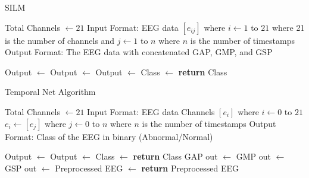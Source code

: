 \documentclass[10pt]{article}
\begin{document}
\begin{algorithm}[H]
\caption{SILM}
    \begin{algorithmic}[2]
     
        \State Total Channels $\gets 21$
        \State Input Format: EEG data $[e_{ij}]$ where $i \gets 1$ to $21$ where 21 is the number of channels
        \State and $j \gets 1$ to $n$ where $n$ is the number of timestamps
        \State 
        \State Output Format: The EEG data with concatenated GAP, GMP, and GSP
        \State

        \State Output $\gets$  
        \State Output $\gets$ 
        \State Output $\gets$ 
        \State Class $\gets$ 
        \State \textbf{return} Class
        \EndProcedure
    \end{algorithmic}
\end{algorithm}

\begin{algorithm}
    \caption{Temporal Net Algorithm}
    \begin{algorithmic}[1]
         
        \State Total Channels $\gets 21$
        \State Input Format: EEG data Channels $[e_i]$ where $i \gets 0$ to $21$
        \State $e_i \gets [e_j]$ where $j \gets 0$ to $n$ where $n$ is the number of timestamps
        \State 
        \State Output Format: Class of the EEG in binary (Abnormal/Normal)
        \State

        \State Output $\gets$  
        \State Output $\gets$ 
        \State Class $\gets$ 
        \State \textbf{return} Class
        \EndProcedure
        \State GAP out $\gets$  
        \State GMP out $\gets$  
        \State GSP out $\gets$  
        \State Preprocessed EEG $\gets$  
        \State \textbf{return} Preprocessed EEG 
    \EndProcedure
    \end{algorithmic}
\end{algorithm}
\end{document}
